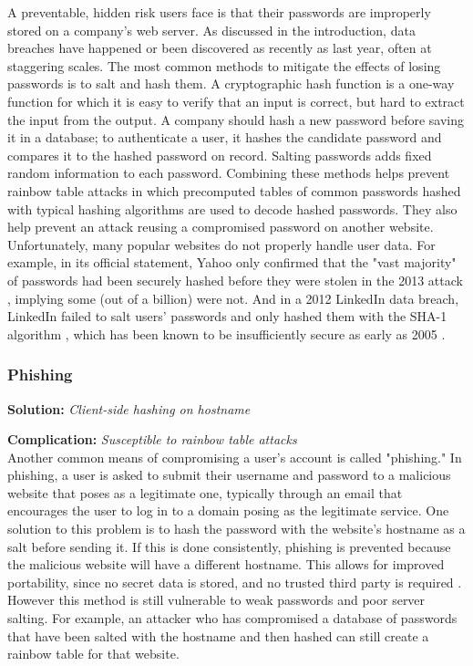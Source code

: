\noindent A preventable, hidden risk users face is that their passwords are improperly stored on a company's web server. As discussed in the introduction, data breaches have happened or been discovered as recently as last year, often at staggering scales. The most common methods to mitigate the effects of losing passwords is to salt and hash them. A cryptographic hash function is a one-way function for which it is easy to verify that an input is correct, but hard to extract the input from the output. A company should hash a new password before saving it in a database; to authenticate a user, it hashes the candidate password and compares it to the hashed password on record. Salting passwords adds fixed random information to each password. Combining these methods helps prevent rainbow table attacks in which precomputed tables of common passwords hashed with typical hashing algorithms are used to decode hashed passwords. They also help prevent an attack reusing a compromised password on another website. Unfortunately, many popular websites do not properly handle user data. For example, in its official statement, Yahoo only confirmed that the "vast majority" of passwords had been securely hashed before they were stolen in the 2013 attack \cite{Lord:2016}, implying some (out of a billion) were not. And in a 2012 LinkedIn data breach, LinkedIn failed to salt users' passwords and only hashed them with the SHA-1 algorithm \cite{Perlroth:2012, Hackett:2016}, which has been known to be insufficiently secure as early as 2005 \cite{Wang:2005}.

\subsubsection{Phishing}

\textbf{Solution:} \emph{Client-side hashing on hostname}

\noindent\textbf{Complication:} \emph{Susceptible to rainbow table attacks}\\

\noindent Another common means of compromising a user's account is called "phishing." In phishing, a user is asked to submit their username and password to a malicious website that poses as a legitimate one, typically through an email that encourages the user to log in to a domain posing as the legitimate service. One solution to this problem is to hash the password with the website's hostname as a salt before sending it. If this is done consistently, phishing is prevented because the malicious website will have a different hostname. This allows for improved portability, since no secret data is stored, and no trusted third party is required \cite{Halderman:2005}. However this method is still vulnerable to weak passwords and poor server salting. For example, an attacker who has compromised a database of passwords that have been salted with the hostname and then hashed can still create a rainbow table for that website.

